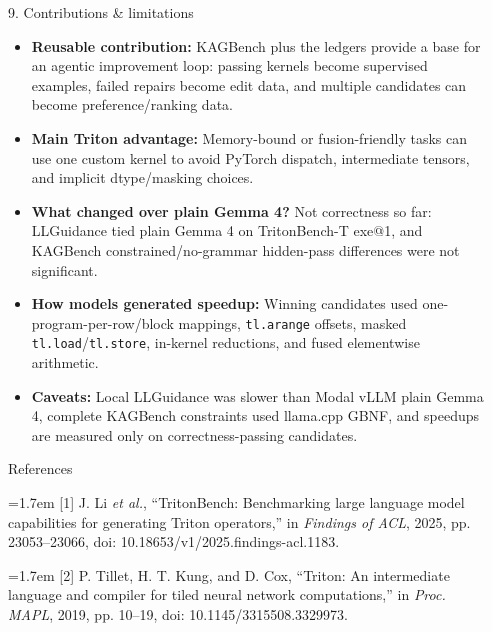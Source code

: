 \documentclass[final]{beamer}
\newlength{\sepwidth}
\newlength{\colwidth}
\newcommand{\separatorcolumn}{\begin{column}{\sepwidth}\end{column}}
\begin{document}
\begin{frame}[t]
\begin{columns}[t]
\begin{column}{\colwidth}
\begin{block}{9. Contributions \& limitations}
    \begin{itemize}
      \item \textbf{Reusable contribution:} KAGBench plus the ledgers provide a base for an agentic improvement loop: passing kernels become supervised examples, failed repairs become edit data, and multiple candidates can become preference/ranking data.
      \item \textbf{Main Triton advantage:} Memory-bound or fusion-friendly tasks can use one custom kernel to avoid PyTorch dispatch, intermediate tensors, and implicit dtype/masking choices.
      \item \textbf{What changed over plain Gemma 4?} Not correctness so far: LLGuidance tied plain Gemma 4 on TritonBench-T exe@1, and KAGBench constrained/no-grammar hidden-pass differences were not significant.
      \item \textbf{How models generated speedup:} Winning candidates used one-program-per-row/block mappings, \texttt{tl.arange} offsets, masked \texttt{tl.load}/\texttt{tl.store}, in-kernel reductions, and fused elementwise arithmetic.
      \item \textbf{Caveats:} Local LLGuidance was slower than Modal vLLM plain Gemma 4, complete KAGBench constraints used llama.cpp GBNF, and speedups are measured only on correctness-passing candidates.
    \end{itemize}

  \end{block}

  \begin{block}{References}

    \scriptsize
    \setlength{\parindent}{0pt}
    \setlength{\parskip}{0.25em}
    \hangindent=1.7em
    [1] J. Li \emph{et al.}, ``TritonBench: Benchmarking large language model capabilities for generating Triton operators,'' in \emph{Findings of ACL}, 2025, pp. 23053--23066, doi: 10.18653/v1/2025.findings-acl.1183.

    \vspace{0.25em}
    \hangindent=1.7em
    [2] P. Tillet, H. T. Kung, and D. Cox, ``Triton: An intermediate language and compiler for tiled neural network computations,'' in \emph{Proc. MAPL}, 2019, pp. 10--19, doi: 10.1145/3315508.3329973.

  \end{block}

\end{column}

\separatorcolumn
\end{columns}
\end{frame}
\end{document}
